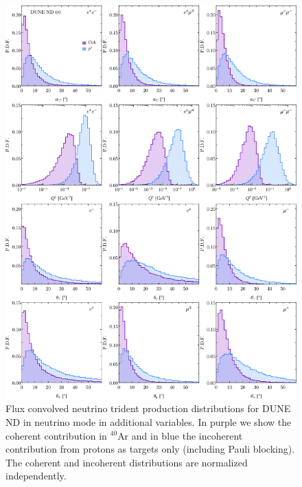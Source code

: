 \begin{figure}[H]
\centering
\includegraphics[width=\textwidth]{figs/DUNE_nu_3horn_aC_Q2_thetapm.pdf}
\caption[Additional trident distributions at the DUNE ND.]{Flux convolved neutrino trident production distributions for DUNE ND in neutrino mode in additional variables. In purple we show the coherent contribution in $^{40}$Ar and in blue the incoherent contribution from protons as targets only (including Pauli blocking). The coherent and incoherent distributions are normalized independently. \label{fig:other_dists}}
\end{figure}
%